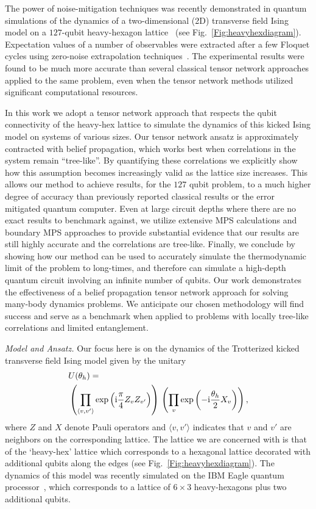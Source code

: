 \documentclass[%
 superscriptaddress,
 amsmath,amssymb,
 prx, nofootinbib,
 twocolumn
]{revtex4-2}
\begin{document}
The power of noise-mitigation techniques was recently demonstrated in quantum simulations of the dynamics of a two-dimensional (2D) transverse field Ising model on a $127$-qubit heavy-hexagon lattice~\cite{kim2023} (see Fig.~\ref{Fig:heavyhexdiagram}). Expectation values of a number of observables were extracted after a few Floquet cycles using zero-noise extrapolation techniques~\cite{temme17}. The experimental results were found to be much more accurate than several classical tensor network approaches applied to the same problem, even when the tensor network methods utilized significant computational resources.

In this work we adopt a tensor network approach that respects the qubit connectivity of the heavy-hex lattice to simulate the dynamics of this kicked Ising model on systems of various sizes. Our tensor network ansatz is approximately contracted with belief propagation, which works best when correlations in the system remain ``tree-like''. By quantifying these correlations we explicitly show how this assumption becomes increasingly valid as the lattice size increases. This allows our method to achieve results, for the $127$ qubit problem, to a much higher degree of accuracy than previously reported classical results or the error mitigated quantum computer. Even at large circuit depths where there are no exact results to benchmark against, we utilize extensive MPS calculations and boundary MPS approaches to provide substantial evidence that our results are still highly accurate and the correlations are tree-like. Finally, we conclude by showing how our method can be used to accurately simulate the thermodynamic limit of the problem to long-times, and therefore can simulate a high-depth quantum circuit involving an infinite number of qubits.
Our work demonstrates the effectiveness of a belief propagation tensor network approach for solving many-body dynamics problems. We anticipate our chosen methodology will find success and serve as a benchmark when applied to problems with locally tree-like correlations and limited entanglement.

\emph{Model and Ansatz.} Our focus here is on the dynamics of the Trotterized kicked transverse field Ising model given by the unitary 
\begin{align}
    &U(\theta_{h}) = \notag \\ &\left(\prod_{\langle v,v' \rangle}\exp \left({\rm i} \frac{\pi}{4}Z_{v}Z_{v'} \right)\right)\,\left(\prod_{v}\exp \left(-{\rm i} \frac{\theta_{h}}{2}X_{v}\right)\right),
    \label{Eq:Propagator}
\end{align}
where $Z$ and $X$ denote Pauli operators and $\langle v,v' \rangle$ indicates that $v$ and $v'$ are neighbors on the corresponding lattice. The lattice we are concerned with is that of the `heavy-hex' lattice which corresponds to a hexagonal lattice decorated with additional qubits along the edges (see Fig.~\ref{Fig:heavyhexdiagram}). The dynamics of this model was recently simulated on the IBM Eagle quantum processor~\cite{kim2023}, which corresponds to a lattice of $6 \times 3$ heavy-hexagons plus two additional qubits. 
\end{document}
